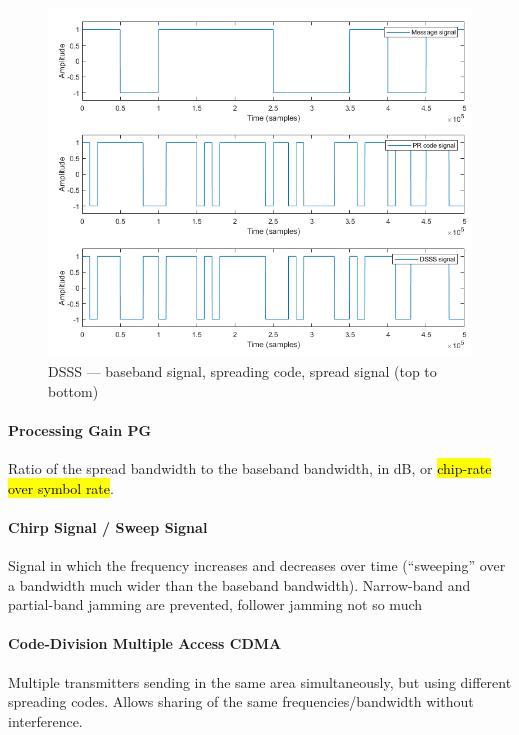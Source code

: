\begin{figure}[h]
	\centering
	\includegraphics[scale=0.6]{images/2-dsss.png}
	\caption{DSSS --- baseband signal, spreading code, spread signal (top to bottom)}%
	\label{fig:dsss}
\end{figure}

\paragraph{Processing Gain PG}
Ratio of the spread bandwidth to the baseband bandwidth, in dB, or \hl{chip-rate over symbol rate}.


\paragraph{Chirp Signal / Sweep Signal}
Signal in which the frequency increases and decreases over time (``sweeping'' over a bandwidth much wider than the baseband bandwidth).
Narrow-band and partial-band jamming are prevented, follower jamming not so much

\paragraph{Code-Division Multiple Access CDMA}
Multiple transmitters sending in the same area simultaneously, but using different spreading codes.
Allows sharing of the same frequencies/bandwidth without interference.

